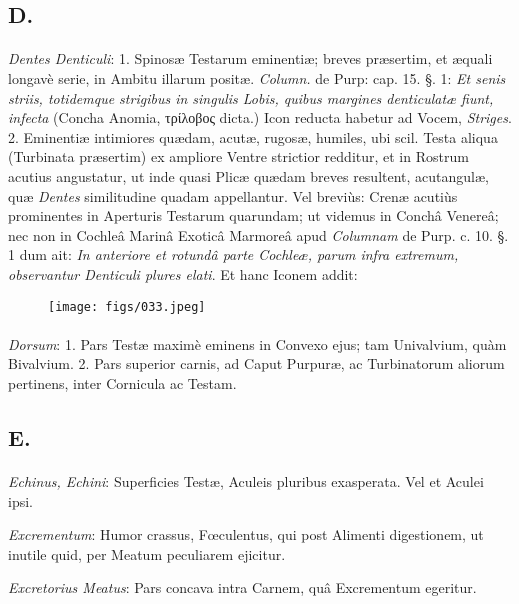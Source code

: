 \documentclass[a4paper, 11pt, oneside, polutonikogreek, german]{article}
\begin{document}
\subsection{D.}
\paragraph{}
\emph{Dentes Denticuli}: 1. Spinosæ Testarum eminentiæ; breves præsertim, et æquali longavè serie, in Ambitu illarum positæ. \emph{Column.} de Purp: cap. 15. §. 1: \emph{Et senis striis, totidemque strigibus in singulis Lobis, quibus margines denticulatæ fiunt, infecta} (Concha Anomia, τρίλοβος dicta.) Icon reducta habetur ad Vocem, \emph{Striges}. 2. Eminentiæ intimiores quædam, acutæ, rugosæ, humiles, ubi scil. Testa aliqua (Turbinata præsertim) ex ampliore Ventre strictior redditur, et in Rostrum acutius angustatur, ut inde quasi Plicæ quædam breves resultent, acutangulæ, quæ \emph{Dentes} similitudine quadam appellantur. Vel breviùs: Crenæ acutiùs prominentes in Aperturis Testarum quarundam; ut videmus in Conchâ Venereâ; nec non in Cochleâ Marinâ Exoticâ Marmoreâ apud \emph{Columnam} de Purp. c. 10. §. 1 dum ait: \emph{In anteriore et rotundâ parte Cochleæ, parum infra extremum, observantur Denticuli plures elati}. Et hanc Iconem addit:

\begin{figure}[H]
\centering
\texttt{[image: figs/033.jpeg]}
\end{figure}
\paragraph{}
\emph{Dorsum}: 1. Pars Testæ maximè eminens in Convexo ejus; tam Univalvium, quàm Bivalvium. 2. Pars superior carnis, ad Caput Purpuræ, ac Turbinatorum aliorum pertinens, inter Cornicula ac Testam.

\subsection{E.}
\paragraph{}
\emph{Echinus, Echini}: Superficies Testæ, Aculeis pluribus exasperata. Vel et Aculei ipsi.

\emph{Excrementum}: Humor crassus, Fœculentus, qui post Alimenti digestionem, ut inutile quid, per Meatum peculiarem ejicitur.

\emph{Excretorius Meatus}: Pars concava intra Carnem, quâ Excrementum egeritur.
\end{document}
